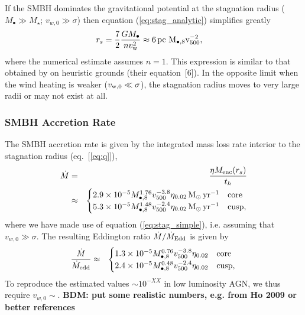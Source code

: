 \documentclass[usenatbib,fleqn]{mn2e}
\newcommand{\eddr}{\dot{M}/\dot{M}_{\rm Edd}}
\newcommand{\rs}{r_s}
\newcommand{\pc}{\rm pc}
\newcommand{\Menc}{M_{\rm enc}}
\newcommand{\Mbh}[1][]{M_{\bullet#1}}
\newcommand{\Mbheight}{M_{\bullet,8}}
\newcommand{\pyear}{{\rm yr}^{-1}}
\renewcommand{\th}{t_h}
\begin{document}
If the SMBH dominates the gravitational potential at the stagnation radius ($M_{\bullet} \gg M_{\star}$; $v_{w,0} \gg \sigma$) then equation (\ref{eq:stag_analytic}) simplifies greatly
\begin{align}
  &\rs=\frac{7}{2}\frac{G \Mbh}{n v_{\rm w}^{2}} \approx 6
 \, \pc \,\, \Mbheight v_{500}^{-2},
  \label{eq:stag_simple}
\end{align}
where the numerical estimate assumes $n = 1$.  This expression is similar to that obtained by \citet{Volonteri+11} on heuristic grounds (their equation~[6]).  In the opposite limit when the wind heating is weaker ($v_{\rm w,0} \ll \sigma$), the stagnation radius moves to very large radii or may not exist at all.  

\subsubsection{SMBH Accretion Rate}

The SMBH accretion rate is given by the integrated mass loss rate interior to the stagnation radius (eq.~[\ref{eq:q}]), 
\begin{eqnarray}
  \dot{M} &=& \frac{\eta \Menc(\rs)}{\th} \nonumber \\
&\approx&
  \begin{cases}
    2.9 \times 10^{-5} M_{\bullet,8}^{1.76}
    v_{500}^{-3.8}  \eta_{0.02} \Msun \, \pyear& \text{core} \\
    5.3 \times 10^{-5} M_{\bullet,8}^{1.48} 
    v_{500}^{-2.4}  \eta_{0.02} \Msun \, \pyear  & \text{cusp}, 
  \end{cases}
  \label{eq:mdot_analytic}
\end{eqnarray}
where we have made use of equation (\ref{eq:stag_simple}), i.e. assuming that $v_{w,0} \gg \sigma$.  The resulting Eddington ratio $\eddr$ is given by 
\begin{eqnarray}
\frac{\dot{M}}{\dot{M}_{\rm edd}} &\approx&
  \begin{cases}
    1.3 \times 10^{-5} M_{\bullet,8}^{0.76}
    v_{500}^{-3.8}  \eta_{0.02}   & \text{core} \\
    2.4 \times 10^{-5} \Mbheight^{0.48} 
    v_{500}^{-2.4}  \eta_{0.02}   & \text{cusp}, 
  \end{cases}
  \label{eq:eddr_analytic}
\end{eqnarray}
To reproduce the estimated values $\sim 10^{-XX}$ in low luminosity AGN, we thus require $v_{w,0} \sim $.  {\bf BDM: put some realistic numbers, e.g. from Ho 2009 or better references}
\end{document}
